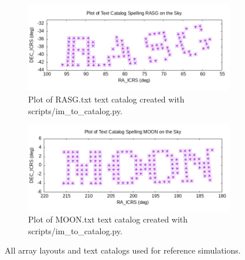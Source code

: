 \documentclass{article}
\begin{document}
\begin{figure}[t!]
\medskip
\begin{subfigure}{0.40\textwidth}
\includegraphics[width=\linewidth]{documentation_figures/RASG.png}
\caption{Plot of RASG.txt text catalog created with scripts/im\_to\_catalog.py.} \label{fig:rasgtxt}
\end{subfigure}\hspace*{\fill}
\begin{subfigure}{0.40\textwidth}
\includegraphics[width=\linewidth]{documentation_figures/MOON.png}
\caption{Plot of MOON.txt text catalog created with scripts/im\_to\_catalog.py.} \label{fig:mooncatalog}
\end{subfigure}

\caption{All array layouts and text catalogs used for reference simulations.} \label{fig:1}
\label{fig:arrays}
\end{figure}
\end{document}

